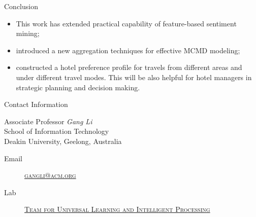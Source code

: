 \documentclass[
 size=12pt,
 paper=smartboard,  %
 mode=present, 		%
 display=slides, 	%
 style=tuliplab,  	%
 pauseslide,
 fleqn,leqno]{powerdot}
\begin{document}
\begin{slide}[toc=,bm=]{Conclusion}
\begin{itemize}
\item This work has extended practical capability of feature-based sentiment mining; \pause

\item introduced a new aggregation techniques for effective MCMD modeling; \pause
 
\item constructed a hotel preference profile for travels from different areas and under different travel modes.
This will be also helpful for hotel managers in strategic planning and decision making.
\end{itemize}
\pause
\begin{center}
\textcolor{red}{}
\end{center}
\end{slide}


\begin{wideslide}[toc=,bm=]{Contact Information}
\centering
{}
\twocolumn[
lcolwidth=0.35\linewidth,
rcolwidth=0.65\linewidth
]
{
}
{
Associate Professor \emph{Gang Li}\\
School of Information Technology\\
Deakin University, Geelong, Australia
\begin{description}
 \item[Email] \href{mailto:gangli@acm.org}
 {\textsc{\footnotesize{gangli@acm.org}}}
 
 \item[Lab] \href{http://www.tulip.academy}
 {\textsc{\footnotesize{Team for Universal Learning and Intelligent Processing}}} 
\end{description}
} 
\end{wideslide}
\end{document}
